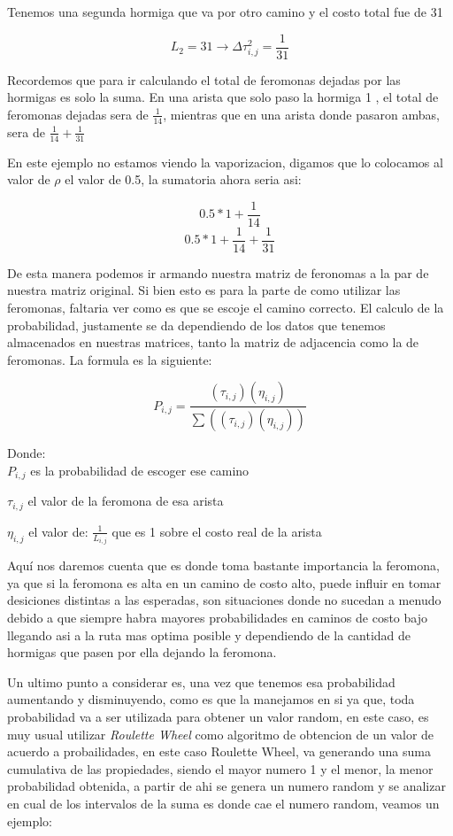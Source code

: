\documentclass[12pt]{article}
\begin{document}
Tenemos una segunda hormiga que va por otro camino y el costo total fue de 31

$$L_2=31 \rightarrow \Delta\tau_{i,j}^2=\frac{1}{31}$$

Recordemos que para ir calculando el total de feromonas dejadas por las hormigas es solo la suma. En una arista que solo paso la hormiga 1
, el total de feromonas dejadas sera de $\frac{1}{14}$, mientras que en una arista donde pasaron ambas, sera de $\frac{1}{14}+\frac{1}{31}$

En este ejemplo no estamos viendo la vaporizacion, digamos que lo colocamos al valor de \textit{$\rho$} el valor de 0.5, la sumatoria ahora seria asi:

$$0.5*1+\frac{1}{14}$$
$$0.5*1+\frac{1}{14}+\frac{1}{31}$$

De esta manera podemos ir armando nuestra matriz de feronomas a la par de nuestra matriz original.
Si bien esto es para la parte de como utilizar las feromonas, faltaria ver como es que se escoje el camino correcto.
El calculo de la probabilidad, justamente se da dependiendo de los datos que tenemos almacenados en nuestras matrices, tanto la matriz de adjacencia
como la de feromonas.
La formula es la siguiente:

$$P_{i,j}=\frac{(\tau_{i,j})(\eta_{i,j})}{\sum((\tau_{i,j})(\eta_{i,j}))}$$

Donde:\\

\hspace{1cm}$P_{i,j}$ es la probabilidad de escoger ese camino

\hspace{1cm}$\tau_{i,j}$ el valor de la feromona de esa arista

\hspace{1cm}$\eta_{i,j}$ el valor de: $\frac{1}{L_{i,j}}$ que es 1 sobre el costo real de la arista

\vspace{5mm}

Aquí nos daremos cuenta que es donde toma bastante importancia la feromona, ya que si la feromona es alta en un camino de costo alto, puede influir en tomar
desiciones distintas a las esperadas, son situaciones donde no sucedan a menudo debido a que siempre habra mayores probabilidades en caminos de costo bajo
llegando asi a la ruta mas optima posible y dependiendo de la cantidad de hormigas que pasen por ella dejando la feromona.

Un ultimo punto a considerar es, una vez que tenemos esa probabilidad aumentando y disminuyendo, como es que la manejamos en si ya que,
toda probabilidad va a ser utilizada para obtener un valor random, en este caso, es muy usual utilizar \textit{Roulette Wheel} como algoritmo de obtencion
de un valor de acuerdo a probailidades, en este caso Roulette Wheel, va generando una suma cumulativa de las propiedades, siendo el mayor numero 1 y el menor,
la menor probabilidad obtenida, a partir de ahi se genera un numero random y se analizar en cual de los intervalos de la suma es donde cae el numero random, veamos un ejemplo:
\end{document}
